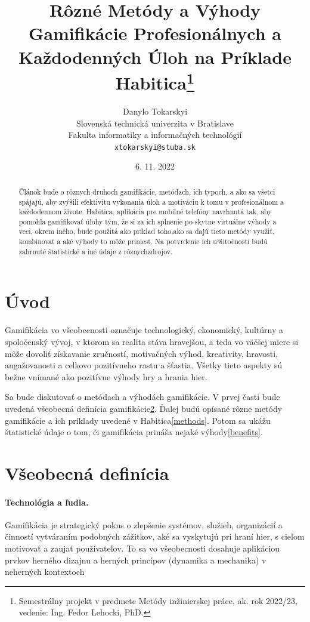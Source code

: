 \documentclass[10pt,twoside,slovak,a4paper]{article}
\title{Rôzné Metódy a Výhody Gamifikácie Profesionálnych a Každodenných Úloh na Príklade Habitica\thanks{Semestrálny 
projekt v predmete Metódy inžinierskej práce, ak. rok 2022/23, vedenie: Ing. Fedor Lehocki, PhD.}}
\author{Danylo Tokarskyi\\[2pt]
	{\small Slovenská technická univerzita v Bratislave}\\
	{\small Fakulta informatiky a informačných technológií}\\
	{\small \texttt{xtokarskyi@stuba.sk}}
	}
\date{\small 6. 11. 2022 } %
\begin{document}
\maketitle

\begin{abstract}
	Článok bude o rôznych druhoch gamifikácie, metódach, ich typoch, a ako sa všetci spájajú, aby zvýšili efektivitu 
	vykonania úloh a motiváciu k tomu v profesionálnom a každodennom živote. Habitica, aplikácia pre mobilné telefóny 
	navrhnutá tak, aby pomohla gamifikovať úlohy tým, že si za ich splnenie po-skytne virtuálne výhody a veci, okrem 
	iného, bude použitá ako príklad toho,ako sa dajú tieto metódy využiť, kombinovať a aké výhody to môže priniesť.
	Na potvrdenie ich u¾itoènosti budú zahrnuté štatistické a iné údaje z rôznychzdrojov.
\end{abstract}



\section{Úvod}

Gamifikácia vo všeobecnosti označuje technologický, ekonomický, kultúrny a spoločenský vývoj, v 
ktorom sa realita stáva hravejšou, a teda vo väčšej miere si môže dovoliť získavanie zručností, 
motivačných výhod, kreativity, hravosti, angažovanosti a celkovo pozitívneho rastu a šťastia. 
Všetky tieto aspekty sú bežne vnímané ako pozitívne výhody hry a hrania hier.\cite{Gamification}

Sa bude diskutovať o metódach a výhodách gamifikácie. 
V prvej časti bude 
uvedená všeobecná definícia 
gamifikácie\ref{definition}. Ďalej budú opísané rôzne metódy gamifikácie 
a ich príklady uvedené v Habitica\ref{methods}. 
Potom sa ukážu štatistické údaje o tom, či gamifikácia 
prináša nejaké výhody\ref{benefits}.




\section{Všeobecná definícia} \label{definition}

\paragraph{Technológia a ľudia.} Gamifikácia je strategický pokus o zlepšenie systémov, služieb, 
organizácií a činností vytváraním podobných zážitkov, 
aké sa vyskytujú pri hraní hier, s cieľom motivovať a zaujať používateľov\cite{Gamification}. 
To sa vo všeobecnosti dosahuje aplikáciou prvkov herného dizajnu a herných princípov 
(dynamika a mechanika) v neherných kontextoch\cite{Defining}
\end{document}

